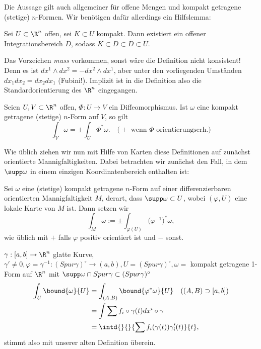 Die Aussage gilt auch allgemeiner für offene Mengen und kompakt getragene (stetige) $n$-Formen. Wir benötigen dafür allerdings ein Hilfslemma:

\begin{lem}\autolabel
	Sei \( U \subset \R^n \) offen, sei $K \subset U$ kompakt. Dann existiert ein offener Integrationsbereich $D$, sodass $K \subset D \subset \bar{D} \subset U$.
\end{lem}

\begin{rem*}
	Das Vorzeichen \emph{muss} vorkommen, sonst wäre die Definition nicht konsistent! Denn es ist \( dx^1 \wedge dx^2 = -dx^2 \wedge dx^1 \), aber unter den vorliegenden Umständen \( dx_1dx_2 = dx_2dx_1 \) (Fubini!). Implizit ist in die Definition also die Standardorientierung des $\R^n$ eingegangen.
\end{rem*}

\begin{lem}\autolabel
	Seien \( U,V \subset \R^n \) offen, \( \Phi: U \to V \) ein Diffeomorphismus. Ist $\omega$ eine kompakt getragene (stetige) $n$-Form auf $V$, so gilt
	\[ \int_V \omega = \pm \int_U \Phi^*\omega.\quad \text{($+$ wenn $\Phi$ orientierungserh.)} \]
\end{lem}

Wie üblich ziehen wir nun mit Hilfe von Karten diese Definitionen auf zunächst orientierte Mannigfaltigkeiten. Dabei betrachten wir zunächst den Fall, in dem $\supp \omega$ in einem einzigen Koordinatenbereich enthalten ist:

\begin{defn}\autolabel{}
	Sei $\omega$ eine (stetige) kompakt getragene $n$-Form auf einer differenzierbaren orientierten Mannigfaltigkeit $M$, derart, dass $\supp \omega \subset U$, wobei \( (\varphi,U) \) eine lokale Karte von $M$ ist. Dann setzen wir 
	\[ \int_M \omega := \pm \int_{\varphi(U)} \big(\varphi^{-1}\big)^* \omega, \]
	wie üblich mit $+$ falls $\varphi$ positiv orientiert ist und $-$ sonst.
\end{defn}

\begin{exmp*}
	\( \gamma: [a,b] \to \R^n \) glatte Kurve, \( \gamma' \neq 0, \varphi= \gamma^{-1}: (Spur \gamma)^\circ \to (a,b), U = (Spur \gamma)^\circ, \omega =  \) kompakt getragene 1-Form auf $\R^n$ mit $\supp \omega \cap Spur \gamma \subset (Spur \gamma)^\circ$
	\begin{align*}
		\int_U \bound{\omega}{U} &= \int_{(A,B)} \bound{\varphi^*\omega}{U} \quad ((A,B) \supset [a,b])\\
		&= \int \sum f_i \circ \gamma(t) dx^i \circ \gamma\\
		&= \intd{}{}{\sum f_i(\gamma(t)) \gamma_i' (t)}{t},
	\end{align*}
	stimmt also mit unserer alten Definition überein.
\end{exmp*}

